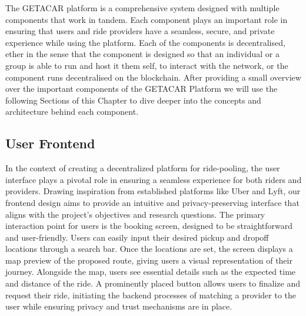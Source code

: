 The GETACAR platform is a comprehensive system designed with multiple components that work in tandem. Each component plays an important role in ensuring that users and ride providers have a seamless, secure, and private experience while using the platform. Each of the components is decentralised, ether in the sense that the component is designed so that an individual or a group is able to run and host it them self, to interact with the network, or the component runs decentralised on the blockchain. After providing a small overview over the important components of the GETACAR Platform we will use the following Sections of this Chapter to dive deeper into the concepts and architecture behind each component. 

\subsection{User Frontend}
In the context of creating a decentralized platform for ride-pooling, the user interface plays a pivotal role in ensuring a seamless experience for both riders and providers. Drawing inspiration from established platforms like Uber and Lyft, our frontend design aims to provide an intuitive and privacy-preserving interface that aligns with the project's objectives and research questions. The primary interaction point for users is the booking screen, designed to be straightforward and user-friendly. Users can easily input their desired pickup and dropoff locations through a search bar. Once the locations are set, the screen displays a map preview of the proposed route, giving users a visual representation of their journey. Alongside the map, users see essential details such as the expected time and distance of the ride. A prominently placed button allows users to finalize and request their ride, initiating the backend processes of matching a provider to the user while ensuring privacy and trust mechanisms are in place.

